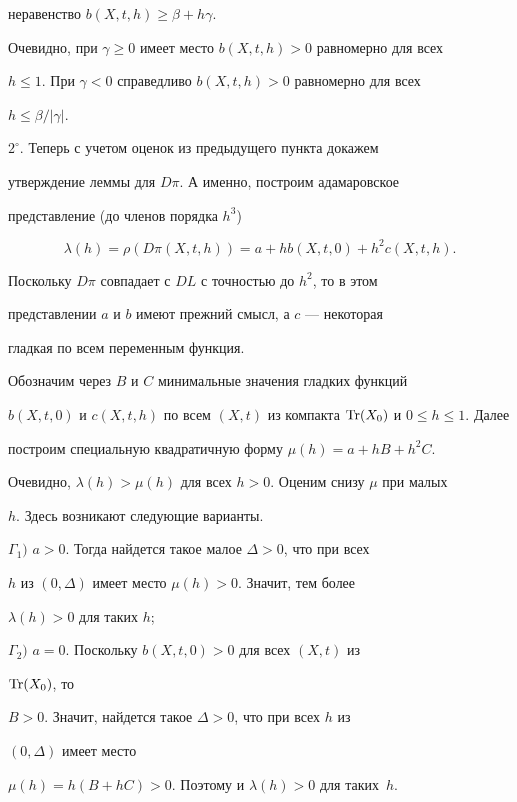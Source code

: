 \begin{pf}
неравенство $b(X,t,h)\ge\beta+h\gamma$. 


Очевидно, при $\gamma\ge0$ имеет место $b(X,t,h)>0$ равномерно для всех 


$h\le1$. При $\gamma<0$ справедливо $b(X,t,h)>0$ равномерно для всех 


$h\le\beta/|\gamma|$. 


 


$2^\circ$. Теперь с учетом оценок из предыдущего пункта докажем 


утверждение леммы для $D\pi$. А именно, построим адамаровское 


представление (до членов порядка $h^3$) 


$$ 


\lambda(h)=\rho(D\pi(X,t,h))=a+h b(X,t,0)+h^2c(X,t,h). 


$$ 


Поскольку $D\pi$ совпадает с $D L$ с точностью до $h^2$, то в этом 


представлении $a$ и $b$ имеют прежний смысл, а $c$ --- некоторая 


гладкая по всем переменным функция. 


 


Обозначим через $B$ и $C$ минимальные значения гладких функций 


$b(X,t,0)$ и $c(X,t,h)$ по всем $(X,t)$ из компакта $\Tr(X_0)$ и $0\le 


h\le 1$. Далее 


построим специальную квадратичную форму $\mu(h)=a+h B+h^2C$. 


Очевидно, $\lambda(h)>\mu(h)$ для всех $h>0$. Оценим снизу $\mu$ при малых 


$h$. Здесь возникают следующие варианты.


 


$\Gamma_1)$ $a>0$. Тогда найдется такое малое $\Delta>0$, что при всех 


$h$ из $(0,\Delta)$ имеет место $\mu(h)>0$. Значит, тем более


$\lambda(h)>0$ для таких $h$; 


 


$\Gamma_2)$ $a=0$. Поскольку $b(X,t,0)>0$ для всех $(X,t)$ из 


$\operatorname{Tr}(X_0)$, то 


$B>0$. Значит, найдется такое $\Delta>0$, что при всех $h$ из 


$(0,\Delta)$ имеет место 


$\mu(h)=h(B+h C)>0$. Поэтому и $\lambda(h)>0$ для таких~$h$. 


\end{pf} 


